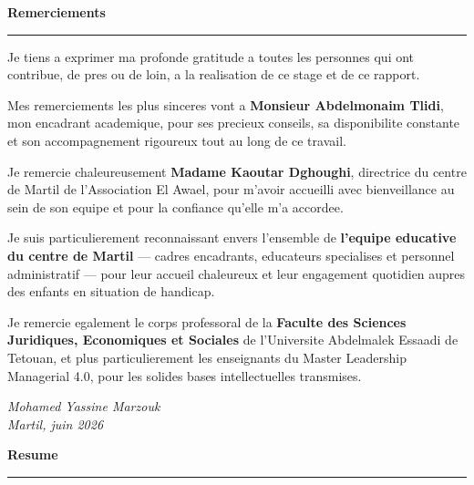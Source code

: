 \documentclass[12pt,a4paper,openany]{report}
\begin{document}
\cleardoublepage
\thispagestyle{empty}
\begin{center}
{\large\bfseries\color{bleu} Remerciements}\\[0.2cm]
\textcolor{bleu}{\rule{0.5\textwidth}{0.5pt}}
\end{center}
\vspace{0.5cm}

Je tiens a exprimer ma profonde gratitude a toutes les personnes
qui ont contribue, de pres ou de loin, a la realisation de ce stage
et de ce rapport.

\vspace{0.3cm}
Mes remerciements les plus sinceres vont a \textbf{Monsieur Abdelmonaim Tlidi},
mon encadrant academique, pour ses precieux conseils, sa disponibilite
constante et son accompagnement rigoureux tout au long de ce travail.

\vspace{0.3cm}
Je remercie chaleureusement \textbf{Madame Kaoutar Dghoughi}, directrice du
centre de Martil de l'Association El Awael, pour m'avoir accueilli avec
bienveillance au sein de son equipe et pour la confiance qu'elle m'a accordee.

\vspace{0.3cm}
Je suis particulierement reconnaissant envers l'ensemble de
\textbf{l'equipe educative du centre de Martil} --- cadres encadrants,
educateurs specialises et personnel administratif --- pour leur accueil
chaleureux et leur engagement quotidien aupres des enfants en situation
de handicap.

\vspace{0.3cm}
Je remercie egalement le corps professoral de la \textbf{Faculte des Sciences
Juridiques, Economiques et Sociales} de l'Universite Abdelmalek Essaadi
de Tetouan, et plus particulierement les enseignants du Master Leadership
Managerial 4.0, pour les solides bases intellectuelles transmises.

\vspace{0.5cm}
\begin{flushright}
\itshape Mohamed Yassine Marzouk\\
Martil, juin 2026
\end{flushright}

\cleardoublepage
\thispagestyle{empty}
\begin{center}
{\large\bfseries\color{bleu} Resume}\\[0.2cm]
\textcolor{bleu}{\rule{0.5\textwidth}{0.5pt}}
\end{center}
\vspace{0.4cm}
\end{document}

